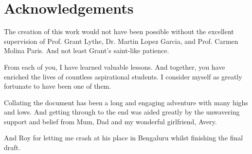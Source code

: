 \chapter*{\centering Acknowledgements}
\label{sup:acknowledgements}

\begin{center}
\begin{minipage}{0.78\textwidth}
\centering
\setlength{\parindent}{0pt}
\setlength{\parskip}{0.9em}

The creation of this work would not have been possible without the excellent supervision of Prof.  Grant Lythe,  Dr. Martin Lopez Garcia,  and Prof.  Carmen Molina Paris.  And not least Grant's saint-like patience.

From each of you,  I have learned valuable lessons.  And together,  you have enriched the lives of countless aspirational students.  I consider myself as greatly fortunate to have been one of them.

Collating the document has been a long and engaging adventure with many highs and lows.  And getting through to the end was aided greatly by the unwavering support and belief from Mum,  Dad and my wonderful girlfriend,  Avery.

And Roy for letting me crash at his place in Bengaluru whilst finishing the final draft.

\end{minipage}
\end{center}
